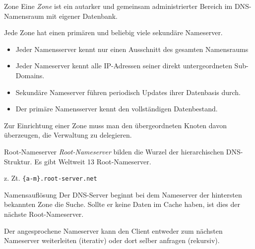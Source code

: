 \begin{defi}{Zone}
    Eine \emph{Zone} ist ein autarker und gemeinsam administrierter Bereich im DNS-Namensraum mit eigener Datenbank.

    Jede Zone hat einen primären und beliebig viele sekundäre Nameserver.

    \begin{itemize}
        \item Jeder Namensserver kennt nur einen Ausschnitt des gesamten Namensraums
        \item Jeder Nameserver kennt alle IP-Adressen seiner direkt untergeordneten Sub-Domains.
        \item Sekundäre Nameserver führen periodisch Updates ihrer Datenbasis durch.
        \item Der primäre Namensserver kennt den vollständigen Datenbestand.
    \end{itemize}

    Zur Einrichtung einer Zone muss man den übergeordneten Knoten davon überzeugen, die Verwaltung zu delegieren.
\end{defi}

\begin{defi}{Root-Nameserver}
    \emph{Root-Nameserver} bilden die Wurzel der hierarchischen DNS-Struktur.
    Es gibt Weltweit 13 Root-Nameserver.

    z. Zt. \texttt{\{a-m\}.root-server.net}
\end{defi}

\begin{defi}{Namensauflösung}
    Der DNS-Server beginnt bei dem Nameserver der hintersten bekannten Zone die Suche.
    Sollte er keine Daten im Cache haben, ist dies der nächste Root-Nameserver.

    Der angesprochene Nameserver kann den Client entweder zum nächsten Nameserver weiterleiten (iterativ) oder dort selber anfragen (rekursiv).
\end{defi}

